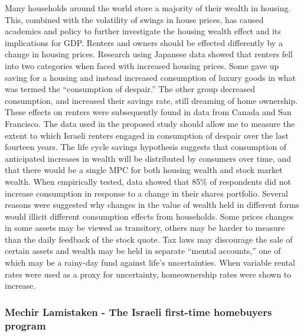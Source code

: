 \documentclass[12pt,a4paper,]{article}
\begin{document}
Many households around the world store a majority of their wealth in
housing. This, combined with the volatility of swings in house prices,
has caused academics and policy to further investigate the housing
wealth effect and its implications for GDP.\autocite{Gan2010} Renters
and owners should be effected differently by a change in housing prices.
Research using Japanese data showed that renters fell into two
categories when faced with increased housing prices. Some gave up saving
for a housing and instead increased consumption of luxury goods in what
was termed the ``consumption of despair.'' The other group decreased
consumption, and increased their savings rate, still dreaming of home
ownership. These effects on renters were subsequently found in data from
Canada and San Francisco.\autocite{Sheiner_1995} The data used in the
proposed study should allow me to measure the extent to which Israeli
renters engaged in consumption of despair over the last fourteen years.
The life cycle savings hypothesis suggests that consumption of
anticipated increases in wealth will be distributed by consumers over
time, and that there would be a single MPC for both housing wealth and
stock market wealth. When empirically tested, data showed that 85\% of
respondents did not increase consumption in response to a change in
their shares portfolio. Several reasons were suggested why changes in
the value of wealth held in different forms would illicit different
consumption effects from households. Some prices changes in some assets
may be viewed as transitory, others may be harder to measure than the
daily feedback of the stock quote. Tax laws may discourage the sale of
certain assets and wealth may be held in separate ``mental accounts,''
one of which may be a rainy-day fund against life's uncertainties. When
variable rental rates were used as a proxy for uncertainty,
homeownership rates were shown to increase.\autocite{CQS2005}

\subsubsection{Mechir Lamistaken - The Israeli first-time homebuyers
program}\label{mechir-lamistaken---the-israeli-first-time-homebuyers-program}
\end{document}
